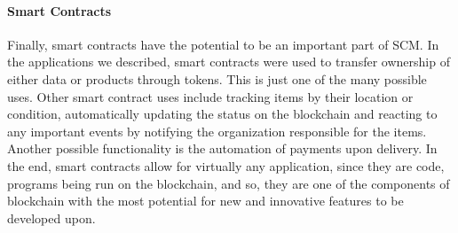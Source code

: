 \paragraph{Smart Contracts}
Finally, smart contracts have the potential to be an important part of SCM. In the applications we described, smart contracts were used to transfer ownership of either data or products through tokens. This is just one of the many possible uses. Other smart contract uses include tracking items by their location or condition, automatically updating the status on the blockchain and reacting to any important events by notifying the organization responsible for the items. Another possible functionality is the automation of payments upon delivery. In the end, smart contracts allow for virtually any application, since they are code, programs being run on the blockchain, and so, they are one of the components of blockchain with the most potential for new and innovative features to be developed upon.
        


